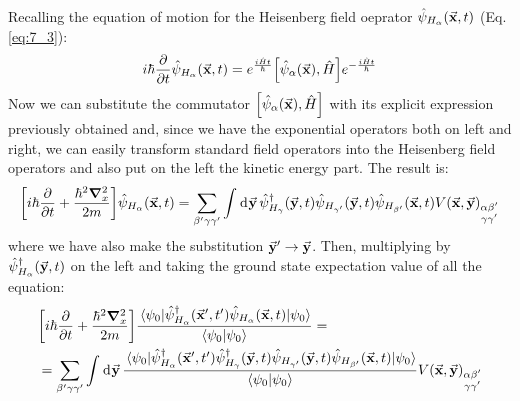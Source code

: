 \documentclass[../main/main.tex]{subfiles}
\begin{document}

Recalling the equation of motion for the Heisenberg field oeprator \( \hat{\psi }_{H_ \alpha } (\va{x},t)  \) (Eq.\eqref{eq:7_3}):
\begin{equation*}
  i \hbar \pdv{}{t} \hat{\psi }_{H_ \alpha } (\va{x},t)  = e^{\frac{i \hat{H}t }{\hbar }} \qty[\hat{\psi }_{\alpha } (\va{x}), \hat{H}  ]
  e^{-\frac{i \hat{H}t }{\hbar }}
\end{equation*}
Now we can substitute the commutator \( \qty[\hat{\psi }_{\alpha } (\va{x}), \hat{H}  ] \) with its explicit expression previously  obtained and, since we have the exponential operators both on left and right, we can easily transform standard field operators into the Heisenberg field operators and also put on the left the kinetic energy part. The result is:
\begin{equation*}
  \qty[i \hbar \pdv{}{t} + \frac{\hbar ^2 \grad _x^2}{2m} ]\hat{\psi }_{H_ \alpha } (\va{x},t)
  = \sum_{\beta'\gamma \gamma'}^{}   \int_{}^{} \dd[]{\va{y}}
  \hat{\psi }_{H_ \gamma } ^\dag (\va{y},t)
  \hat{\psi }_{H_ {\gamma'} }  (\va{y},t)
  \hat{\psi }_{H_ {\beta'} }  (\va{x},t)  V (\va{x},\va{y})_{\substack{\alpha \beta'  \\ \gamma \gamma'   } }
\end{equation*}
where we have also make the substitution \( \va{y}' \rightarrow \va{y}\).
Then, multiplying by \( \hat{\psi }_{H_ \alpha  } ^\dag (\va{y},t)  \) on the left and taking the ground state expectation value of all the equation:
\begin{equation*}
\begin{split}
  &\qty[i \hbar \pdv{}{t} + \frac{\hbar ^2 \grad _x^2}{2m} ] \frac{\expval{ \hat{\psi }_{H_ \alpha }^\dag  (\va{x}',t')
  \hat{\psi }_{H_ \alpha } (\va{x},t)
  }{\psi_0} }{\braket{\psi _0}{\psi _0} }
  = \\
  &=\sum_{\beta'\gamma \gamma'}^{}  \int_{}^{} \dd[]{\va{y}}
  \frac{\expval{
  \hat{\psi }_{H_ \alpha } ^\dag (\va{x}',t')
  \hat{\psi }_{H_ \gamma } ^\dag (\va{y},t)
  \hat{\psi }_{H_ {\gamma'} } (\va{y},t)
  \hat{\psi }_{H_ {\beta'} } (\va{x},t)
  }{\psi_0}
  }{\braket{\psi _0}{\psi _0} }
  V(\va{x},\va{y})_{\substack{\alpha \beta'  \\ \gamma \gamma'   } }
\end{split}
\end{equation*}
\end{document}
